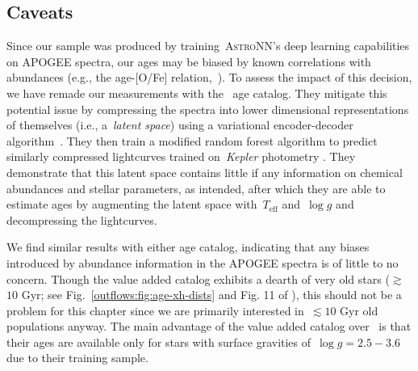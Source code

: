 \subsection{Caveats}
\label{outflows:sec:results:caveats}
Since our sample was produced by training~\textsc{AstroNN}'s deep learning
capabilities on APOGEE spectra, our ages may be biased by known correlations
with abundances (e.g., the age-[O/Fe] relation,~\citealt{Feuillet2019}).
To assess the impact of this decision, we have remade our measurements with
the~\citet{Leung2023} age catalog.
They mitigate this potential issue by compressing the spectra into lower
dimensional representations of themselves (i.e., a~\textit{latent space}) using
a variational encoder-decoder algorithm~\citep[e.g.,][]{LeCun2015}.
They then train a modified random forest algorithm to predict similarly
compressed lightcurves trained on~\textit{Kepler} photometry
\citep{Borucki2010}.
They demonstrate that this latent space contains little if any information on
chemical abundances and stellar parameters, as intended, after which they are
able to estimate ages by augmenting the latent space with~$T_\text{eff}$
and~$\log g$ and decompressing the lightcurves.
\par
We find similar results with either age catalog, indicating that any biases
introduced by abundance information in the APOGEE spectra is of little to no
concern.
Though the value added catalog exhibits a dearth of very old stars
($\gtrsim$$10$ Gyr; see Fig.~\ref{outflows:fig:age-xh-dists} and Fig. 11 of
\citealt{Leung2023}), this should not be a problem for this chapter since we
are primarily interested in~$\lesssim$$10$ Gyr old populations anyway.
The main advantage of the value added catalog over~\citet{Leung2023} is that
their ages are available only for stars with surface gravities
of~$\log g = 2.5 - 3.6$ due to their training sample.
